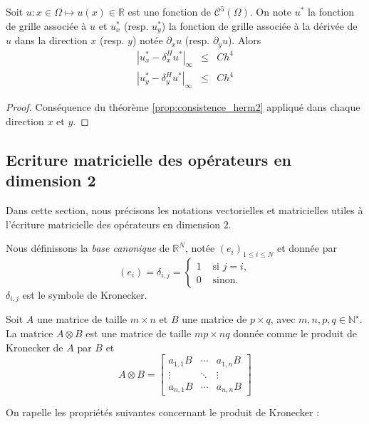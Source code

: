 \begin{theoreme}
Soit $u : x \in \Omega \mapsto u(x) \in \mathbb{R}$ est une fonction de $\mathcal{C}^5 (\Omega)$. On note $u^*$ la fonction de grille associée à $u$ et $u_x^*$ (resp. $u_y^*$) la fonction de grille associée à la dérivée de $u$ dans la direction $x$ (resp. $y$) notée $\partial_x u$ (resp. $\partial_y u$). Alors
\begin{equation}
\begin{array}{rcl}
|u^*_{x} - \delta_x^H u^*|_{\infty} &\leq& C h^4\\
|u^*_{y} - \delta_y^H u^*|_{\infty} &\leq& C h^4
\end{array}
\end{equation}
\end{theoreme}

\begin{proof}
Conséquence du théorème \ref{prop:consistence_herm2} appliqué dans chaque direction $x$ et $y$.
\end{proof}













\subsection{Ecriture matricielle des opérateurs en dimension 2}

Dans cette section, nous précisons les notations vectorielles et matricielles utiles à l'écriture matricielle des opérateurs en dimension 2.

Nous définissons la \textit{base canonique} de $\mathbb{R}^N$, notée $\left(e_i \right)_{1 \leq i \leq N}$ et donnée par 
\begin{equation}
\left( e_i \right) = \delta_{i,j} = \left\lbrace
\begin{array}{rl}
1 & \text{ si } j=i,\\
0 & \text{ sinon.}
\end{array}
\right.
\end{equation}
$\delta_{i,j}$ est le symbole de Kronecker.

\begin{definition}
Soit $A$ une matrice de taille $m \times n$ et $B$ une matrice de $p \times q$, avec $m, n, p, q \in \mathbb{N}^{\star}$. La matrice $A \otimes B$ est une matrice de taille $mp \times nq$ donnée comme le produit de Kronecker de $A$ par $B$ et 
\begin{equation}
A \otimes B = 
\begin{bmatrix}
a_{1,1}B & \cdots & a_{1,n}B \\ 
\vdots & \ddots & \vdots \\ 
a_{n,1}B & \cdots & a_{n,n}B
\end{bmatrix} 
\end{equation}
\end{definition}
On rapelle les propriétés suivantes concernant le produit de Kronecker :

